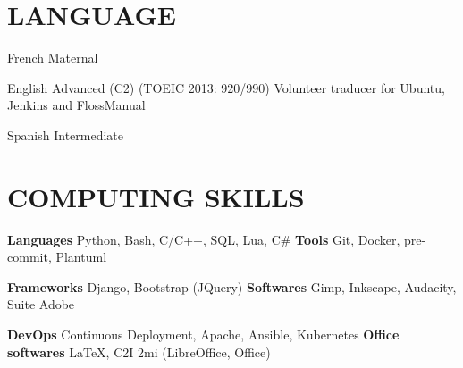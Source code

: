 \documentclass[11pt,a4paper]{moderncv}
\begin{document}






  \section{LANGUAGE}\label{sec:language}

  \cvlanguage
    {French}
    {Maternal}{}{}{}{}

  \cvlanguage
    {English}
    {Advanced (C2) (TOEIC 2013: 920/990)}
    {Volunteer traducer for Ubuntu, Jenkins and FlossManual}

  \cvlanguage
    {Spanish}
    {Intermediate}
    {}{}{}{}

  \section{COMPUTING SKILLS}\label{sec:computing-skills}

  \cvcomputer
    {\textbf{Languages}}
    {Python, Bash, C/C++, SQL, Lua, C\#}
    {\textbf{Tools}}
    {Git, Docker, pre-commit, Plantuml}

  \cvcomputer
    {\textbf{Frameworks}}
    {Django, Bootstrap (JQuery)}
    {\textbf{Softwares}}
    {Gimp, Inkscape, Audacity, Suite Adobe}

  \cvcomputer
    {\textbf{DevOps}}
    {Continuous Deployment, Apache, Ansible, Kubernetes}
    {\textbf{Office softwares}}
    {\LaTeX{}, C2I 2mi (LibreOffice, Office)}
\end{document}

